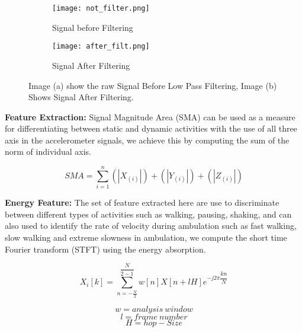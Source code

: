 \documentclass[a4paper, parskip=full]{scrartcl}
\begin{document}
 \begin{figure}
 	\begin{subfigure}{.5\textwidth}
 		\centering
 		\texttt{[image: not\_filter.png]}
 		\caption{Signal before Filtering }
 		\label{fig:sub1}
 	\end{subfigure}
 	\begin{subfigure}{.5\textwidth}
 		\centering
 		\texttt{[image: after\_filt.png]}
 		\caption{Signal After Filtering}
 		\label{fig:sub2}
 	\end{subfigure}
 	
 	\caption{Image (a) show the raw Signal Before Low Pass Filtering, Image (b) Shows Signal After Filtering.}
 	
 \end{figure}
\textbf{Feature Extraction:} Signal Magnitude Area (SMA) can be used as a measure for differentiating between static and dynamic activities with the use of all three axis in the accelerometer signals, we achieve this by computing the sum of the norm of individual axis.  

\[SMA = \sum_{i =1}^{n}{(|X_{(i)}|)} + {(|Y_{(i)}|)} + {(|Z_{(i)}|)}\]

\textbf{Energy Feature:} The set of feature extracted here are use to  discriminate between different  types of activities such as walking, pausing, shaking, and can also used to identify the rate of velocity during ambulation such as fast walking, slow walking and extreme slowness in ambulation, we compute the short time Fourier transform (STFT) using the energy absorption.


\[X_i{[k]} = \sum_{n = -\frac{N}{2}}^{\dfrac{N}{2-1}}{w{[n]X}}  {[n + l H]e} ^{-j2\pi\dfrac{kn}{N}}\]

\[w = analysis\ window \]
\[l = frame\ number\]
\[H = hop- Size\]
\end{document}
